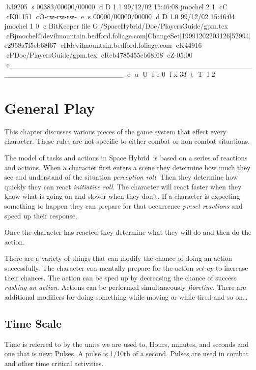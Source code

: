 h39205
s 00383/00000/00000
d D 1.1 99/12/02 15:46:08 jmochel 2 1
cC
cK01151
cO-rw-rw-rw-
e
s 00000/00000/00000
d D 1.0 99/12/02 15:46:04 jmochel 1 0
c BitKeeper file G:/SpaceHybrid/Doc/PlayersGuide/gpm.tex
cBjmochel@devilmountain.bedford.foliage.com|ChangeSet|19991202203126|52994|e2968a7f5cb68f67
cHdevilmountain.bedford.foliage.com
cK44916
cPDoc/PlayersGuide/gpm.tex
cReb4785455cb68f68
cZ-05:00
c______________________________________________________________________
e
u
U
f e 0
f x 33
t
T
I 2
\chapter{General Play}

This chapter discusses various pieces of the game system that effect 
every character. These rules are not specific to either combat or 
non-combat situations.  

The model of tasks and actions in Space Hybrid\ is based on a series of 
reactions and actions. When a character first enters a scene
they determine how much they see and understand of the situation {\em
{perception roll}}. Then they determine how quickly they can react {\em 
{initiative roll}}. The character will react faster when they know what
is going on and slower when they don't. If a character is expecting 
something to happen they can prepare for that occurrence {\em preset 
reactions} and speed up their response. 

Once the character has reacted they determine what they will do and then 
do the action. 

There are a variety of things that can modify the chance of doing an 
action successfully. The character can mentally prepare for the 
action {\em set-up} to increase their chances. The action can be sped 
up by decreasing the chance of success {\em rushing an action}. 
Actions can be performed simultaneously {\em floretine}. There are 
additional modifiers for doing something while moving or while tired 
and so on\dots

\section{Time Scale}

Time is referred to by the units we are used to, Hours, minutes, and seconds 
and one that is new: Pulses. A {pulse} is 1/10th of a second. Pulses are
used in combat and other time critical activities.

